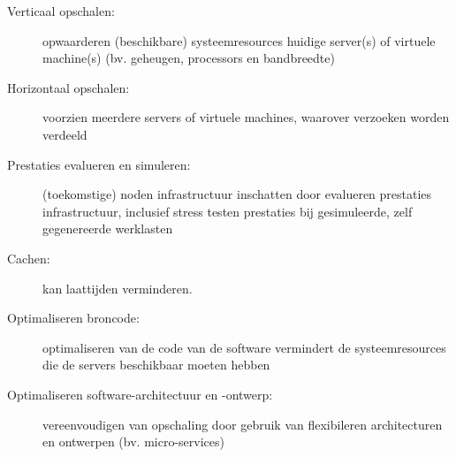 \begin{description}
    \item [Verticaal opschalen:] opwaarderen (beschikbare)
    systeemresources huidige server(s) of virtuele machine(s)
    (bv. geheugen, processors en bandbreedte)
    \cite{lu2014applicationdriven, michael2007scaleup, appuswamy2013scaleup}

    \item [Horizontaal opschalen:] voorzien meerdere servers of virtuele
    machines, waarover verzoeken worden verdeeld
    \cite{lu2014applicationdriven, michael2007scaleup}

    \item [Prestaties evalueren en simuleren:] (toekomstige) noden infrastructuur
    inschatten door evalueren prestaties infrastructuur, inclusief
    stress testen prestaties bij gesimuleerde, zelf gegenereerde
    werklasten 

    \item [Cachen:] kan laattijden verminderen.

    \item [Optimaliseren broncode:] optimaliseren van de code van de software
    vermindert de systeemresources die de servers beschikbaar moeten hebben

    \item [Optimaliseren software-architectuur en -ontwerp:] vereenvoudigen van
    opschaling door gebruik van flexibileren architecturen en ontwerpen 
    (bv. micro-services)
\end{description}

